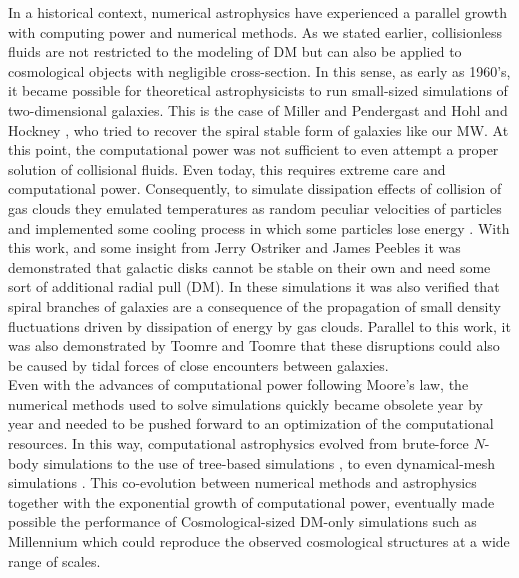 In a historical context, numerical astrophysics have experienced a parallel growth with computing power and numerical methods. As we stated earlier, collisionless fluids are not restricted to the modeling of DM but can also be applied to cosmological objects with negligible cross-section. In this sense, as early as 1960's, it became possible for theoretical astrophysicists to run small-sized simulations of two-dimensional galaxies. This is the case of Miller and Pendergast \cite{Miller_and_Prendergast_1968} and Hohl and Hockney  \cite{Hohl_and_Hockney_1969}, who tried to recover the spiral stable form of galaxies like our MW. At this point, the computational power was not sufficient to even attempt a proper solution of collisional fluids. Even today, this requires extreme care and computational power. Consequently, to simulate dissipation effects of collision of gas clouds they emulated temperatures as random peculiar velocities of particles and implemented some cooling process in which some particles lose energy \cite{Miller_et_al._1970}. With this work, and some insight from Jerry Ostriker and James Peebles \cite{Ostriker_and_Peebles_1973} it was demonstrated that galactic disks cannot be stable on their own and need some sort of additional radial pull (DM). In these simulations it was also verified that spiral branches of galaxies are a consequence of the propagation of small density fluctuations driven by dissipation of energy by gas clouds. Parallel to this work, it was also demonstrated by Toomre and Toomre \cite{Toomre_and_Toomre_1972} that these disruptions could also be caused by tidal forces of close encounters between galaxies.\\


Even with the advances of computational power following Moore's law, the numerical methods used to solve simulations quickly became obsolete year by year and needed to be pushed forward to an optimization of the computational resources. In this way, computational astrophysics evolved from brute-force $N$-body simulations to the use of tree-based simulations \cite{Barnes_and_Hut_1986}, to even dynamical-mesh simulations \cite{Berger_and_Colella_1989}. This co-evolution between numerical methods and astrophysics together with the exponential growth of computational power, eventually made possible the performance of Cosmological-sized DM-only simulations such as Millennium which could reproduce the observed cosmological structures at a wide range of scales. \\ 

